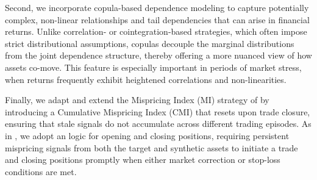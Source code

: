 Second, we incorporate copula-based dependence modeling to capture potentially complex, non-linear relationships and tail dependencies that can arise in financial returns. Unlike correlation- or cointegration-based strategies, which often impose strict distributional assumptions, copulas decouple the marginal distributions from the joint dependence structure, thereby offering a more nuanced view of how assets co-move. This feature is especially important in periods of market stress, when returns frequently exhibit heightened correlations and non-linearities.

Finally, we adapt and extend the Mispricing Index (MI) strategy of \cite{Xie2016} by introducing a Cumulative Mispricing Index (CMI) that resets upon trade closure, ensuring that stale signals do not accumulate across different trading episodes. As in \cite{Rad2016}, we adopt an  logic for opening and closing positions, requiring persistent mispricing signals from both the target and synthetic assets to initiate a trade and closing positions promptly when either market correction or stop-loss conditions are met.


